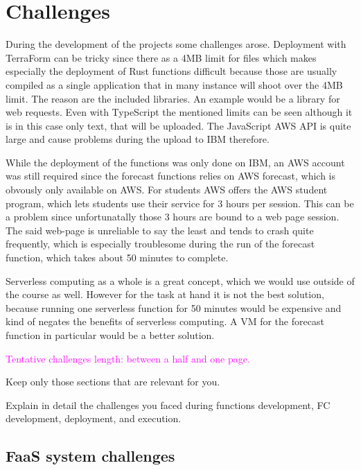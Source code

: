 \chapter{\label{chap:challenges}Challenges}

During the development of the projects some challenges arose. Deployment with
TerraForm can be tricky since there as a 4MB limit for files which makes
especially the deployment of Rust functions difficult because those are usually
compiled as a single application that in many instance will shoot over the 4MB
limit. The reason are the included libraries. An example would be a library for
web requests. Even with TypeScript the mentioned limits can be seen although it
is in this case only text, that will be uploaded. The JavaScript AWS API is
quite large and cause problems during the upload to IBM therefore.

While the deployment of the functions was only done on IBM, an AWS account was
still required since the forecast functions relies on AWS forecast, which is
obvously only available on AWS. For students AWS offers the AWS student
program, which lets students use their service for 3 hours per session. This
can be a problem since unfortunatally those 3 hours are bound to a web page
session.  The said web-page is unreliable to say the least and tends to crash
quite frequently, which is especially troublesome during the run of the
forecast function, which takes about 50 minutes to complete.

Serverless computing as a whole is a great concept, which we would use outside
of the course as well. However for the task at hand it is not the best solution,
because running one serverless function for 50 minutes would be expensive and
kind of negates the benefits of serverless computing. A VM for the forecast function
in particular would be a better solution.



\textcolor{magenta}{Tentative challenges length: between a half and one page.}

\vspace{20 pt}

Keep only those sections that are relevant for you.

\vspace{20 pt}

Explain in detail the challenges you faced during functions development, FC development, deployment, and execution.


%
%
%
\section{FaaS system challenges}

